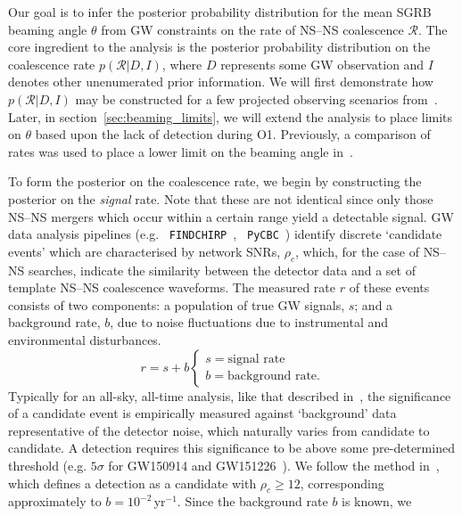 \documentclass[twocolumn,nofootinbib]{revtex4-1}
\newcommand{\cbcrate}{{{\mathcal R}}}
\newcommand{\BNS}{\ac{NS}--\ac{NS}\xspace}
\begin{document}
Our goal is to infer the posterior probability distribution for the mean
\ac{SGRB} beaming angle $\theta$ from \ac{GW} constraints on the rate of \BNS
coalescence $\cbcrate$.  The core ingredient to the analysis is the posterior
probability distribution on the coalescence rate $p(\cbcrate|D,I)$, where $D$
represents some \ac{GW} observation and $I$ denotes other unenumerated prior
information.  We will first demonstrate how $p(\cbcrate|D,I)$ may be constructed
for a few projected observing scenarios from~\cite{Aasi:2013wya}.  Later, in
section~\ref{sec:beaming_limits}, we will extend the analysis to place
limits on $\theta$ based upon the lack of detection during O1. Previously, a
comparison of rates was used to place a lower limit on the beaming angle
in~\cite{Abbott:2016ymx}.

To form the posterior on the coalescence rate, we begin by constructing the
posterior on the \emph{signal} rate.  Note that these are not identical since
only those \BNS mergers which occur within a certain range yield a detectable
signal.  \ac{GW} data analysis pipelines (e.g. {\tt
FINDCHIRP}~\cite{2012PhRvD..85l2006A}, {\tt
PyCBC}~\cite{Canton:2014ena,Usman:2015kfa,alex_nitz_2017_844934}) identify
discrete `candidate events' which are characterised by network \acp{SNR},
$\rho_c$, which, for the case of \BNS searches, indicate the similarity between
the detector data and a set of template \BNS coalescence waveforms.  The
measured rate $r$ of these events consists of two components: a population of
true \ac{GW} signals, $s$; and a background rate, $b$, due to noise fluctuations
due to instrumental and environmental disturbances.
%
\begin{equation}
r = s + b
\begin{cases}
s = \text{signal rate} \\
b = \text{background rate}.
\end{cases}
\end{equation}
%
Typically for an all-sky, all-time analysis, like that described
in~\cite{Usman:2015kfa}, the significance of a candidate event is
empirically measured against `background' data representative of the
detector noise, which naturally varies from candidate to candidate.  A
detection requires this significance to be above some pre-determined
threshold (e.g. $5\sigma$ for GW150914 and
GW151226~\cite{Abbott:2016blz,Abbott:2016nmj}).  We follow the method
in~\cite{Aasi:2013wya}, which defines a detection as a candidate with
$\rho_c \geq 12$, corresponding approximately to
$b=10^{-2}$\,yr$^{-1}$.  Since the background rate $b$ is known, we
\end{document}
